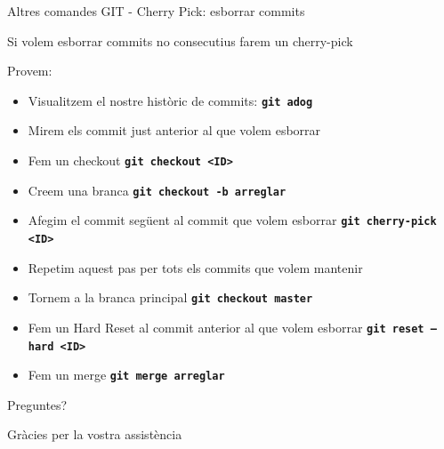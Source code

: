 \documentclass[10pt,xcolor={rgb}]{beamer}
\begin{document}
    \begin{frame}[fragile]{Altres comandes GIT - Cherry Pick: esborrar commits}

      Si volem esborrar commits no consecutius farem un cherry-pick
      \begin{block}{Provem:}
      \begin{itemize}
        \item Visualitzem el nostre històric de commits: \texttt{\textbf{git adog}}
        \item Mirem els commit just anterior al que volem esborrar
        \item Fem un checkout \texttt{\textbf{git checkout <ID>}}
        \item Creem una branca \texttt{\textbf{git checkout -b arreglar}}
        \item Afegim el commit següent al commit que volem esborrar \texttt{\textbf{git cherry-pick <ID>}}
        \item Repetim aquest pas per tots els commits que volem mantenir
        \item Tornem a la branca principal \texttt{\textbf{git checkout master}}
        \item Fem un Hard Reset al commit anterior al que volem esborrar \texttt{\textbf{git reset --hard <ID>}}
        \item Fem un merge \texttt{\textbf{git merge arreglar}}
      \end{itemize}
      \end{block}
    \end{frame}

    \begin{frame}[standout]
      Preguntes?
    \end{frame}

    \begin{frame}{}
      Gràcies per la vostra assistència
    \end{frame}
    
\end{document}
